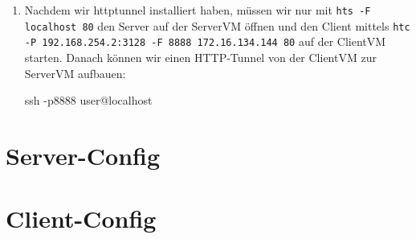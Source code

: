 \documentclass[a4paper,10pt]{scrartcl}
\begin{document}
\begin{enumerate}[\bfseries 1.]
	\item
        Nachdem wir httptunnel installiert haben, müssen wir nur mit
		\texttt{hts -F localhost 80} den Server auf der ServerVM öffnen und
		den Client mittels \texttt{htc -P 192.168.254.2:3128 -F 8888
		172.16.134.144 80} auf der ClientVM starten. Danach können wir einen
		HTTP-Tunnel von der ClientVM zur ServerVM aufbauen:
        \begin{usercommands}
ssh -p8888 user@localhost
        \end{usercommands}
\end{enumerate}

\bigskip

\begin{appendices}
    \section{Server-Config}
    
    \section{Client-Config}
    
\end{appendices}
\end{document}
